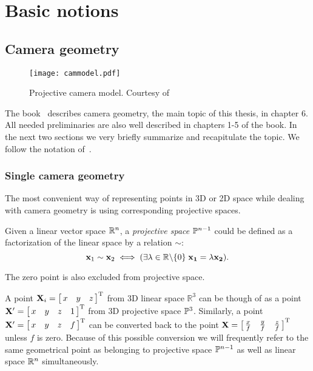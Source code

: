 
\chapter{Basic notions}

\label{seq:basic}

\section{Camera geometry}

\begin{figure}[t]
  \begin{center}
    \texttt{[image: cammodel.pdf]}
    \caption[Projective camera model]{Projective camera model. Courtesy of~\cite{HartZiss}}
    \label{cameramodel}
  \end{center}
\end{figure}

The book~\cite{HartZiss} describes camera geometry, the main topic of this thesis, in chapter 6. All needed preliminaries are also well described in chapters 1-5 of the book. In the next two sections we very briefly summarize and recapitulate the topic. We follow the notation of~\cite{HartZiss}.

\subsection{Single camera geometry}

The most convenient way of representing points in 3D or 2D space while dealing with camera geometry is using corresponding projective spaces.

\begin{defn}
Given a linear vector space $\R^n$, a \textit{projective space} $\Proj^{n-1}$ could be defined as a factorization of the linear space by a relation $\sim$: \[\mathbf{x}_1 \sim \mathbf{x}_2 \iff (\exists \lambda \in \R\backslash\{0\} \; \mathbf{x_1}=\lambda \mathbf{x_2}).\]

The zero point is also excluded from projective space.
\end{defn}


A point $\mathbf{X}_i=\mat{ccc}{x & y & z}^\T$ from 3D linear space $\mathbb{R}^3$  can be though of as a point $\mathbf{X}'=\mat{cccc}{x & y & z & 1}^\T$ from 3D projective space $\Proj^3$. Similarly, a point $\mathbf{X}'=\mat{cccc}{x & y & z & f}^\T$ can be converted back to the point $\mathbf{X}=\mat{ccc}{\frac{x}{f} & \frac{y}{f} & \frac{z}{f}}^\T$ unless $f$ is zero. Because of this possible conversion we will frequently refer to the same geometrical point as belonging to projective space $\Proj^{n-1}$ as well as linear space $\R^n$ simultaneously. 

